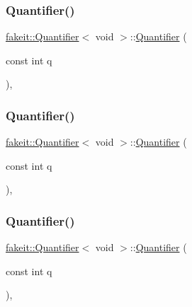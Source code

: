 \subsubsection{\texorpdfstring{Quantifier()}{Quantifier()}\hspace{0.1cm}{\footnotesize\ttfamily [6/9]}}
{\footnotesize\ttfamily \mbox{\hyperlink{structfakeit_1_1Quantifier}{fakeit\+::\+Quantifier}}$<$ void $>$\+::\mbox{\hyperlink{structfakeit_1_1Quantifier}{Quantifier}} (\begin{DoxyParamCaption}\item[{const int}]{q }\end{DoxyParamCaption})\hspace{0.3cm}{\ttfamily [inline]}, {\ttfamily [explicit]}}

\mbox{\label{structfakeit_1_1Quantifier_3_01void_01_4_aa43b73adf29aa234b3c15b66c9e985c0}} 
\subsubsection{\texorpdfstring{Quantifier()}{Quantifier()}\hspace{0.1cm}{\footnotesize\ttfamily [7/9]}}
{\footnotesize\ttfamily \mbox{\hyperlink{structfakeit_1_1Quantifier}{fakeit\+::\+Quantifier}}$<$ void $>$\+::\mbox{\hyperlink{structfakeit_1_1Quantifier}{Quantifier}} (\begin{DoxyParamCaption}\item[{const int}]{q }\end{DoxyParamCaption})\hspace{0.3cm}{\ttfamily [inline]}, {\ttfamily [explicit]}}

\mbox{\label{structfakeit_1_1Quantifier_3_01void_01_4_aa43b73adf29aa234b3c15b66c9e985c0}} 
\subsubsection{\texorpdfstring{Quantifier()}{Quantifier()}\hspace{0.1cm}{\footnotesize\ttfamily [8/9]}}
{\footnotesize\ttfamily \mbox{\hyperlink{structfakeit_1_1Quantifier}{fakeit\+::\+Quantifier}}$<$ void $>$\+::\mbox{\hyperlink{structfakeit_1_1Quantifier}{Quantifier}} (\begin{DoxyParamCaption}\item[{const int}]{q }\end{DoxyParamCaption})\hspace{0.3cm}{\ttfamily [inline]}, {\ttfamily [explicit]}}

